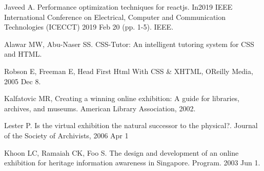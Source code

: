 \begin{thebibliography}{1}
Javeed A. Performance optimization techniques for reactjs. In2019 IEEE International Conference on Electrical, Computer and Communication Technologies (ICECCT) 2019 Feb 20 (pp. 1-5). IEEE.

Alawar MW, Abu-Naser SS. CSS-Tutor: An intelligent tutoring system for CSS and HTML.

Robson E, Freeman E, Head First Html With CSS & XHTML, OReilly Media, 2005 Dec 8.

Kalfatovic MR, Creating a winning online exhibition: A guide for libraries, archives, and museums. American Library Association, 2002.

Lester P. Is the virtual exhibition the natural successor to the physical?. Journal of the Society of Archivists, 2006 Apr 1

Khoon LC, Ramaiah CK, Foo S. The design and development of an online exhibition for heritage information awareness in Singapore. Program. 2003 Jun 1.












\end{thebibliography}
